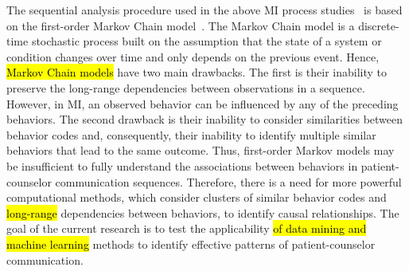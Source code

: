 \documentclass[smallextended]{svjour3}       %
\begin{document}
The sequential analysis procedure used in the above MI process studies~\cite{moyers2006therapist, catley2006adherence, thrasher2006motivational, mccambridge2011fidelity} is based on the first-order Markov Chain model~\cite{moyers2006therapist, moyers2009session, gaume2010counselor}. The Markov Chain model is a discrete-time stochastic process built on the assumption that the state of a system or condition changes over time and only depends on the previous event. Hence, \hl{Markov Chain models} have two main drawbacks. The first is their inability to preserve the long-range dependencies between observations in a sequence. However, in MI, an observed behavior can be influenced by any of the preceding behaviors. The second drawback is their inability to consider similarities between behavior codes and, consequently, their inability to identify multiple similar behaviors that lead to the same outcome. Thus, first-order Markov models may be insufficient to fully understand the associations between behaviors in patient-counselor communication sequences. Therefore, there is a need for more powerful computational methods, which consider clusters of similar behavior codes and \hl{long-range} dependencies between behaviors, to identify causal relationships. The goal of the current research is to test the applicability \hl{of data mining and machine learning} methods to identify effective patterns of patient-counselor communication.
\end{document}

